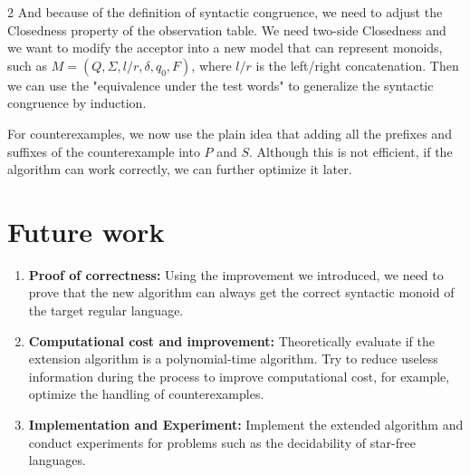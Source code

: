 \documentclass[10pt, a4paper]{article} %
\begin{document}
\begin{multicols}{2}
And because of the definition of syntactic congruence, we need to adjust the Closedness property of the observation table. We need two-side Closedness and we want to modify the acceptor into a new model that can represent monoids, such as $M = (Q,\Sigma,l/r,\delta,q_0,F)$, where $l/r$ is the left/right concatenation. 
Then we can use the "equivalence under the test words" to generalize the syntactic congruence by induction. 

For counterexamples, we now use the plain idea that adding all the prefixes and suffixes of the counterexample into $P$ and $S$. Although this is not efficient, if the algorithm can work correctly, we can further optimize it later.

\section{Future work}
\begin{enumerate}[leftmargin=*]
    \item \textbf{Proof of correctness:} Using the improvement we introduced, we need to prove that the new algorithm can always get the correct syntactic monoid of the target regular language.
    \item \textbf{Computational cost and improvement:} Theoretically evaluate if the extension algorithm is a polynomial-time algorithm. Try to reduce useless information during the process to improve computational cost, for example, optimize the handling of counterexamples.
    \item \textbf{Implementation and Experiment:} Implement the extended algorithm and conduct experiments for problems such as the decidability of star-free languages.
\end{enumerate}

 


\end{multicols}
\end{document}
